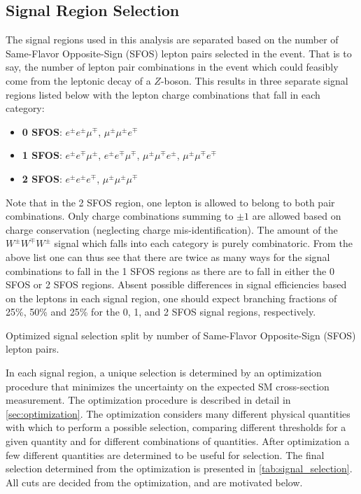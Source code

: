 \subsection{Signal Region Selection}
\label{sec:signal_regions}
The signal regions used in this analysis are separated based on the number of 
Same-Flavor Opposite-Sign (SFOS) lepton pairs selected in the event.  That is to say,
the number of lepton pair combinations in the event 
which could feasibly come from the leptonic decay of a $Z$-boson.
This results in three separate signal regions listed 
below with the lepton charge combinations
that fall in each category:
\begin{itemize}
\item \textbf{0 SFOS}: $e^{\pm}e^{\pm}\mu^{\mp}$, 
$\mu^{\pm}\mu^{\pm}e^{\mp}$ 
\item \textbf{1 SFOS}: $e^{\pm}e^{\mp}\mu^{\pm}$, 
$e^{\pm}e^{\mp}\mu^{\mp}$, $\mu^{\pm}\mu^{\mp}e^{\pm}$, $\mu^{\pm}\mu^{\mp}e^{\mp}$
\item \textbf{2 SFOS}: $e^{\pm}e^{\pm}e^{\mp}$, $\mu^{\pm}\mu^{\pm}\mu^{\mp}$
\end{itemize}
Note that in the 2 SFOS region, one lepton is allowed to belong to both 
pair combinations.
Only charge combinations summing to $\pm 1$ are allowed based on charge
conservation (neglecting charge mis-identification).  
The amount of the $W^{\pm}W^{\mp}W^{\pm}$ signal
which falls into each category is purely combinatoric.  
From the above list one can thus see that there are twice as many ways 
for the signal combinations to fall in the 1 SFOS regions as 
there are to fall in either the 0 SFOS or 2 SFOS regions. 
Absent possible differences in signal efficiencies based on the leptons in each 
signal region, one should expect branching 
fractions of 25\%, 50\% and 25\% for the 0, 1, and 2 SFOS signal regions, respectively.


\begin{table}[ht!]
\centering
\begin{small}

\end{small}
\caption{Optimized signal selection split by number of Same-Flavor 
Opposite-Sign (SFOS) lepton pairs.}
\label{tab:signal_selection}
\end{table}

In each signal region, a unique selection is determined by an optimization
procedure that minimizes the uncertainty on the expected SM cross-section
measurement. 
The optimization procedure is described in detail in \sec\ref{sec:optimization}.
The optimization considers many different physical quantities 
with which to perform a possible selection, comparing different
thresholds for a given quantity and for different combinations of 
quantities. After optimization a few different quantities
are determined to be useful for selection. 
The final selection determined from the optimization
is presented in \tab\ref{tab:signal_selection}.
All cuts are decided from the optimization, and are motivated below.

